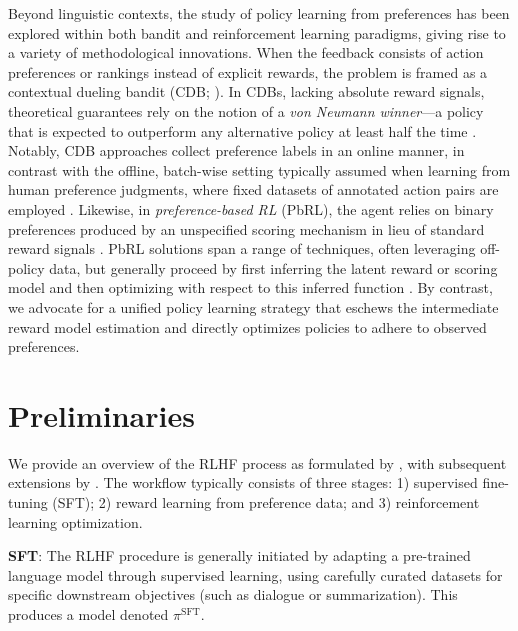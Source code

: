 Beyond linguistic contexts, the study of policy learning from preferences has been explored within both bandit and reinforcement learning paradigms, giving rise to a variety of methodological innovations. When the feedback consists of action preferences or rankings instead of explicit rewards, the problem is framed as a contextual dueling bandit (CDB; \cite{yue2012karmed,dudik2015contextual}). In CDBs, lacking absolute reward signals, theoretical guarantees rely on the notion of a \textit{von Neumann winner}—a policy that is expected to outperform any alternative policy at least half the time \citep{dudik2015contextual}. Notably, CDB approaches collect preference labels in an online manner, in contrast with the offline, batch-wise setting typically assumed when learning from human preference judgments, where fixed datasets of annotated action pairs are employed \citep{yan2022human}. Likewise, in \textit{preference-based RL} (PbRL), the agent relies on binary preferences produced by an unspecified scoring mechanism in lieu of standard reward signals \citep{BusaFekete2014,ruiz2023dueling}. PbRL solutions span a range of techniques, often leveraging off-policy data, but generally proceed by first inferring the latent reward or scoring model and then optimizing with respect to this inferred function \citep{jain2013learning,BusaFekete2014,christiano2017deep,sadigh2017active,kupcsik2018learning}. By contrast, we advocate for a unified policy learning strategy that eschews the intermediate reward model estimation and directly optimizes policies to adhere to observed preferences.

\section{Preliminaries}\label{section:prelims}

We provide an overview of the RLHF process as formulated by \citeauthor{ziegler2020finetuning}, with subsequent extensions by \citep{stiennon2022learning, bai2022training, ouyang2022training}. The workflow typically consists of three stages: 1) supervised fine-tuning (SFT); 2) reward learning from preference data; and 3) reinforcement learning optimization.

\textbf{SFT}: The RLHF procedure is generally initiated by adapting a pre-trained language model through supervised learning, using carefully curated datasets for specific downstream objectives (such as dialogue or summarization). This produces a model denoted $\pi^\text{SFT}$.


